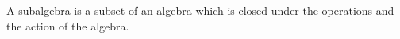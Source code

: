 \begin{definition}[Subalgebra]
    A subalgebra is a subset of an algebra which is closed under the operations and the action of the algebra.
\end{definition}
